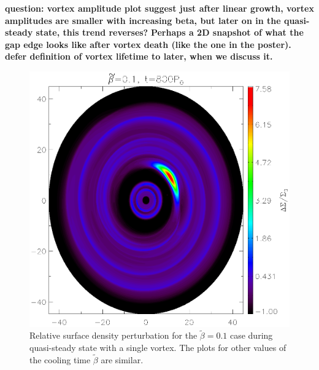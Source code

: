 
{\bf question: vortex amplitude plot suggest just after linear growth,
  vortex amplitudes are smaller with increasing beta, but later on in
  the quasi-steady state, this trend reverses?  
}
{\bf Perhaps a 2D snapshot of what the gap edge looks like after
  vortex death (like the one in the poster). defer definition of
  vortex lifetime to later, when we discuss it. 
}

\begin{figure}
  \includegraphics[width=\linewidth,height=\linewidth]{figures/vortex2D}
  \caption{Relative surface density perturbation for the
    $\tilde\beta=0.1$ case during quasi-steady state with a single
    vortex. The plots for other values of the cooling time
    $\tilde{\beta}$ are similar.
    \label{Vortex2D}} 
\end{figure}

